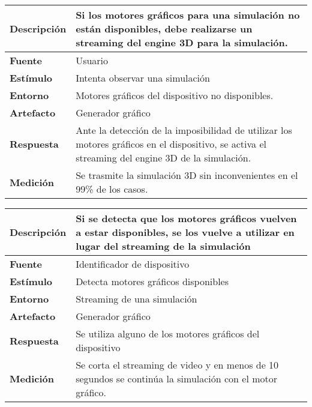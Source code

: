 \begin{center}
  \begin{tabular}{| l | p{10cm} | }
    \hline
	\textbf{Descripción} & Si los motores gráficos para una simulación no están disponibles, debe realizarse un streaming del engine 3D para la simulación. \\  \hline
	\textbf{Fuente} & Usuario \\  \hline
	\textbf{Estímulo} & Intenta observar una simulación\\  \hline
	\textbf{Entorno} & Motores gráficos del dispositivo no disponibles.\\  \hline
	\textbf{Artefacto} & Generador gráfico\\  \hline
	\textbf{Respuesta} & Ante la detección de la imposibilidad de utilizar los motores gráficos en el dispositivo, se activa el streaming del engine 3D de la simulación.\\  \hline
	\textbf{Medición} & Se trasmite la simulación 3D sin inconvenientes en el 99\% de los casos.\\  \hline
  \end{tabular}
\end{center}  

\begin{center}
  \begin{tabular}{| l | p{10cm} | }
    \hline
	\textbf{Descripción} & Si se detecta que los motores gráficos vuelven a estar disponibles, se los vuelve a utilizar en lugar del streaming de la simulación \\  \hline
	\textbf{Fuente} & Identificador de dispositivo\\  \hline
	\textbf{Estímulo} & Detecta motores gráficos disponibles\\  \hline
	\textbf{Entorno} & Streaming de una simulación\\  \hline
	\textbf{Artefacto} & Generador gráfico\\  \hline
	\textbf{Respuesta} & Se utiliza alguno de los motores gráficos del dispositivo\\  \hline
	\textbf{Medición} & Se corta el streaming de video y en menos de 10 segundos se continúa la simulación con el motor gráfico.\\  \hline
  \end{tabular}
\end{center}  

